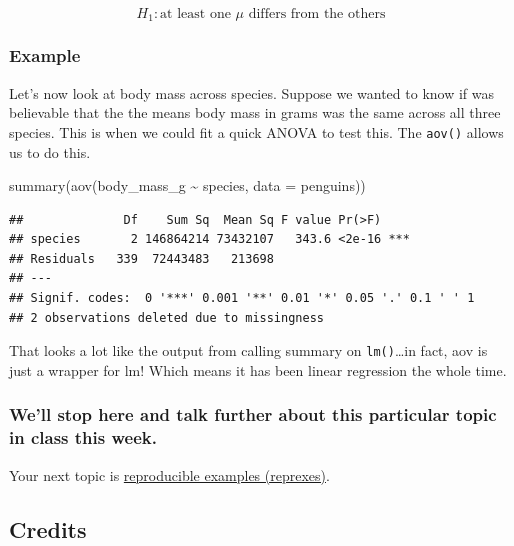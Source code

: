 \documentclass[
]{book}
\newenvironment{Shaded}{\begin{snugshade}}{\end{snugshade}}
\newcommand{\AttributeTok}[1]{\textcolor[rgb]{0.77,0.63,0.00}{#1}}
\newcommand{\FunctionTok}[1]{\textcolor[rgb]{0.00,0.00,0.00}{#1}}
\newcommand{\NormalTok}[1]{#1}
\newcommand{\SpecialCharTok}[1]{\textcolor[rgb]{0.00,0.00,0.00}{#1}}
\begin{document}
\[H_1: \text{at least one }\mu \text{ differs from the others} \]

\hypertarget{example-3}{%
\subsubsection{Example}\label{example-3}}

Let's now look at body mass across species. Suppose we wanted to know if was believable that the the means body mass in grams was the same across all three species. This is when we could fit a quick ANOVA to test this. The \texttt{aov()} allows us to do this.

\begin{Shaded}
\begin{Highlighting}[]
\FunctionTok{summary}\NormalTok{(}\FunctionTok{aov}\NormalTok{(body\_mass\_g }\SpecialCharTok{\textasciitilde{}}\NormalTok{ species, }\AttributeTok{data =}\NormalTok{ penguins))}
\end{Highlighting}
\end{Shaded}

\begin{verbatim}
##              Df    Sum Sq  Mean Sq F value Pr(>F)    
## species       2 146864214 73432107   343.6 <2e-16 ***
## Residuals   339  72443483   213698                   
## ---
## Signif. codes:  0 '***' 0.001 '**' 0.01 '*' 0.05 '.' 0.1 ' ' 1
## 2 observations deleted due to missingness
\end{verbatim}

That looks a lot like the output from calling summary on \texttt{lm()}\ldots in fact, aov is just a wrapper for lm! Which means it has been linear regression the whole time.

\hypertarget{well-stop-here-and-talk-further-about-this-particular-topic-in-class-this-week.}{%
\subsubsection{We'll stop here and talk further about this particular topic in class this week.}\label{well-stop-here-and-talk-further-about-this-particular-topic-in-class-this-week.}}

Your next topic is \href{https://q.utoronto.ca/courses/204826/pages/w1-reproducible-examples-reprex?module_item_id=2184624}{reproducible examples (reprexes)}.

\hypertarget{credits}{%
\subsection{Credits}\label{credits}}
\end{document}
